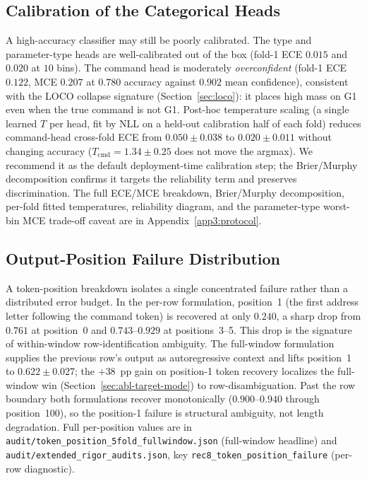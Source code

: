 \documentclass[sensors,article,submit,moreauthors,pdftex]{Definitions/mdpi}
\begin{document}
\subsection{Calibration of the Categorical Heads}
\label{sec:calibration}

A high-accuracy classifier may still be poorly calibrated. The type and parameter-type heads are well-calibrated out of the box (fold-1 ECE $0.015$ and $0.020$ at $10$ bins). The command head is moderately \emph{overconfident} (fold-1 ECE $0.122$, MCE $0.207$ at $0.780$ accuracy against $0.902$ mean confidence), consistent with the LOCO collapse signature (Section~\ref{sec:loco}): it places high mass on G1 even when the true command is not G1. Post-hoc temperature scaling (a single learned $T$ per head, fit by NLL on a held-out calibration half of each fold) reduces command-head cross-fold ECE from $0.050 \pm 0.038$ to $0.020 \pm 0.011$ without changing accuracy ($T_{\text{cmd}} = 1.34 \pm 0.25$ does not move the argmax). We recommend it as the default deployment-time calibration step; the Brier/Murphy decomposition confirms it targets the reliability term and preserves discrimination. The full ECE/MCE breakdown, Brier/Murphy decomposition, per-fold fitted temperatures, reliability diagram, and the parameter-type worst-bin MCE trade-off caveat are in Appendix~\ref{app3:protocol}.

\subsection{Output-Position Failure Distribution}
\label{sec:output-position-failure}

A token-position breakdown isolates a single concentrated failure rather than a distributed error budget. In the per-row formulation, position~1 (the first address letter following the command token) is recovered at only $0.240$, a sharp drop from $0.761$ at position~0 and $0.743$--$0.929$ at positions~3--5. This drop is the signature of within-window row-identification ambiguity. The full-window formulation supplies the previous row's output as autoregressive context and lifts position~1 to $0.622 \pm 0.027$; the $+38$~pp gain on position-1 token recovery localizes the full-window win (Section~\ref{sec:abl-target-mode}) to row-disambiguation. Past the row boundary both formulations recover monotonically ($0.900$--$0.940$ through position~100), so the position-1 failure is structural ambiguity, not length degradation. Full per-position values are in \texttt{audit/token\_position\_5fold\_fullwindow.json} (full-window headline) and \texttt{audit/extended\_rigor\_audits.json}, key \texttt{rec8\_token\_position\_failure} (per-row diagnostic).
\end{document}

